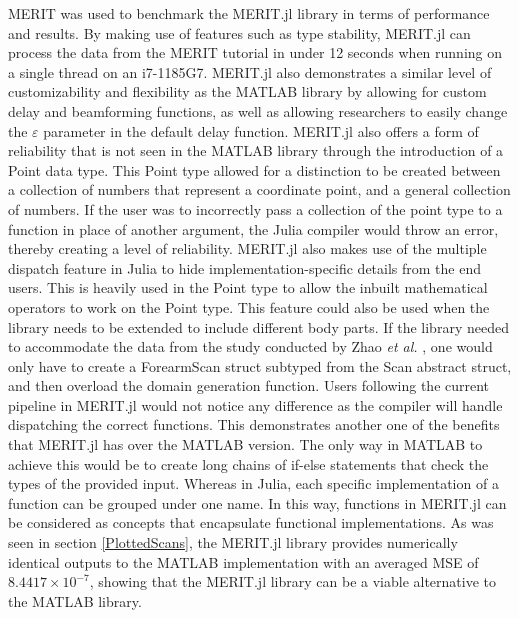 MERIT was used to benchmark the MERIT.jl library in terms of performance and results. By making use of features such as
type stability, MERIT.jl can process the data from the MERIT tutorial in under 12 seconds when running on a single
thread on an i7-1185G7. MERIT.jl also demonstrates a similar level of customizability and flexibility as the MATLAB
library by allowing for custom delay and beamforming functions, as well as allowing researchers to easily change the
$\varepsilon$ parameter in the default delay function. MERIT.jl also offers a form of reliability that is not seen in
the MATLAB library through the introduction of a Point data type. This Point type allowed for a distinction to be
created between a collection of numbers that represent a coordinate point, and a general collection of numbers. If the
user was to incorrectly pass a collection of the point type to a function in place of another argument, the Julia
compiler would throw an error, thereby creating a level of reliability. MERIT.jl also makes use of the multiple dispatch
feature in Julia to hide implementation-specific details from the end users. This is heavily used in the Point
type to allow the inbuilt mathematical operators to work on the Point type. This feature could also be used when the
library needs to be extended to include different body parts. If the library needed to accommodate the data from the
study conducted by Zhao \textit{et al.} \cite{gilmoreMicrowaveImagingHuman2013}, one would only have to create a
ForearmScan struct subtyped from the Scan abstract struct, and then overload the domain generation function. Users
following the current pipeline in MERIT.jl would not notice any difference as the compiler will handle dispatching the
correct functions. This demonstrates another one of the benefits that MERIT.jl has over the MATLAB version. The only way
in MATLAB to achieve this would be to create long chains of if-else statements that check the types of the provided
input. Whereas in Julia, each specific implementation of a function can be grouped under one name. In this way,
functions in MERIT.jl can be considered as concepts that encapsulate functional implementations. As was seen in section
\ref{PlottedScans}, the MERIT.jl library provides numerically identical outputs to the MATLAB implementation with an
averaged MSE of $8.4417 \times 10^{-7}$, showing that the MERIT.jl library can be a viable alternative to the MATLAB
library.

